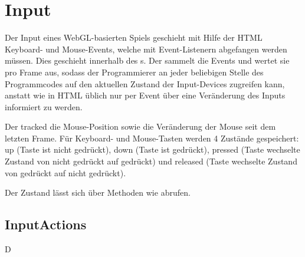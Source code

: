 \chapter{Input}

Der Input eines WebGL-basierten Spiels geschieht mit Hilfe der HTML Keyboard- und Mouse-Events, welche mit Event-Listenern abgefangen werden müssen. Dies geschieht innerhalb des s. Der  sammelt die Events und wertet sie pro Frame aus, sodass der Programmierer an jeder beliebigen Stelle des Programmcodes auf den aktuellen Zustand der Input-Devices zugreifen kann, anstatt wie in HTML üblich nur per Event über eine Veränderung des Inputs informiert zu werden.

Der  tracked die Mouse-Position sowie die Veränderung der Mouse seit dem letzten Frame. Für Keyboard- und Mouse-Tasten werden 4 Zustände gespeichert: up (Taste ist nicht gedrückt), down (Taste ist gedrückt), pressed (Taste wechselte Zustand von nicht gedrückt auf gedrückt) und released (Taste wechselte Zustand von gedrückt auf nicht gedrückt).

Der Zustand lässt sich über Methoden wie  abrufen.

\section{InputActions}

D

